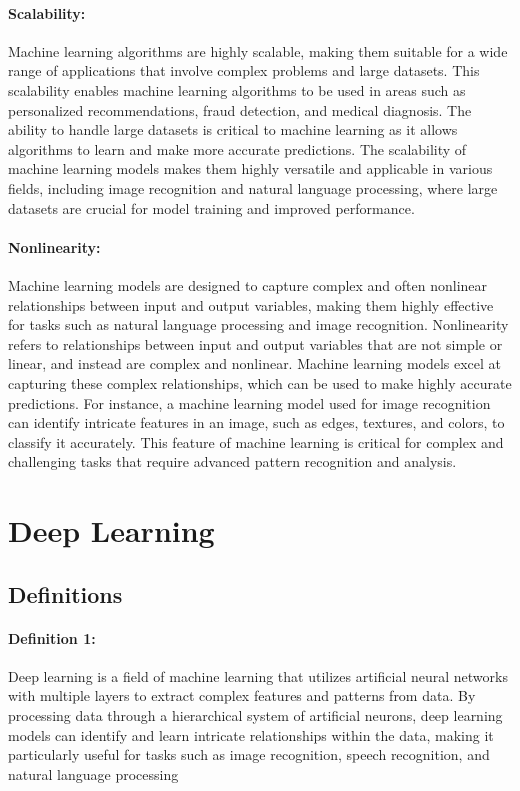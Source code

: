 		\paragraph{Scalability: }
		Machine learning algorithms are highly scalable, making them suitable for a wide range of applications that involve complex problems and large datasets. This scalability enables machine learning algorithms to be used in areas such as personalized recommendations, fraud detection, and medical diagnosis. The ability to handle large datasets is critical to machine learning as it allows algorithms to learn and make more accurate predictions. The scalability of machine learning models makes them highly versatile and applicable in various fields, including image recognition and natural language processing, where large datasets are crucial for model training and improved performance. \cite{jordan2015machine}
		
		\paragraph{Nonlinearity: }
		Machine learning models are designed to capture complex and often nonlinear relationships between input and output variables, making them highly effective for tasks such as natural language processing and image recognition. Nonlinearity refers to relationships between input and output variables that are not simple or linear, and instead are complex and nonlinear. Machine learning models excel at capturing these complex relationships, which can be used to make highly accurate predictions. For instance, a machine learning model used for image recognition can identify intricate features in an image, such as edges, textures, and colors, to classify it accurately. This feature of machine learning is critical for complex and challenging tasks that require advanced pattern recognition and analysis. \cite{lecun2015deep}
		
		
\section{Deep Learning}
	\subsection{Definitions}
			\paragraph{Definition 1:}
				Deep learning is a field of machine learning that utilizes artificial neural networks with multiple layers to extract complex features and patterns from data. By processing data through a hierarchical system of artificial neurons, deep learning models can identify and learn intricate relationships within the data, making it particularly useful for tasks such as image recognition, speech recognition, and natural language processing \cite{goodfellow2016deep}
